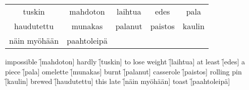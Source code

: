 \begin{center}
  \begin{tabular}{|c c c c c|}
    \hline
    tuskin & mahdoton & laihtua & edes & pala \\
    haudutettu & munakas & palanut & paistos & kaulin \\
    näin myöhään & paahtoleipä &&& \\
    \hline
  \end{tabular}
\end{center}

\begin{questions}
  \begin{multicols}{3}
    \raggedcolumns
    \question impossible     \f[mahdoton]
    \question hardly         \f[tuskin]
    \question to lose weight \f[laihtua]
    \question at least       \f[edes]
    \question a piece        \f[pala]
    \question omelette       \f[munakas]
    \question burnt          \f[palanut]
    \question casserole      \f[paistos]
    \question rolling pin    \f[kaulin]
    \question brewed         \f[haudutettu]
    \question this late      \f[näin myöhään]
    \question toast          \f[paahtoleipä]
  \end{multicols}
\end{questions}
